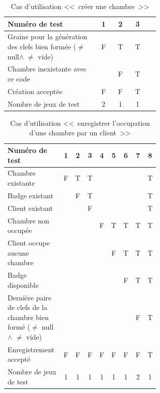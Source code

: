 \documentclass[11pt,article]{article}
\newcommand{\nullvalue}{\textsf{null}\xspace}
\begin{document}
\begin{table}[htbp!]
\begin{tabular}{|p{0.6\linewidth}|c|c|c|c|}
\hline
Numéro de test
&1&2&3\\
\hline

\hline
Graine pour la génération des clefs bien formée ($\neq$ \nullvalue $\land$ $\neq$ vide)
&F&T&T\\
\hline
Chambre inexistante avec ce code
& &F&T\\
\hline
\hline
Création acceptée
&F&F&T\\
\hline
\hline
Nombre de jeux de test
&2&1&1\\
\hline
\end{tabular}
\caption{Cas d'utilisation <<~créer une chambre~>>}
\end{table}
        \begin{table}[htbp!]
            \begin{tabular}{|p{0.6\linewidth}|c|c|c|c|c|c|c|c|}
                \hline
                Numéro de test
                    &1&2&3&4&5&6&7&8\\

                \hline
                Chambre existante
                    &F&T&T& & & & &T\\
                \hline
                Badge existant
                    & &F&T& & & & &T\\
				\hline
                Client existant
                    & & &F& & & & &T\\
                \hline
                \hline
                Chambre non occupée
                    & & & &F&T&T&T&T\\
                \hline
				\hline
				Client occupe aucune chambre
					& & & & &F&T&T&T\\
				\hline
				\hline
				Badge disponible
					& & & & & &F&T&T\\
				\hline
				\hline
                Dernière paire de clefs de la chambre bien formé ($\neq$ \nullvalue $\land$ $\neq$ vide)
                    & & & & & & &F&T\\
                \hline
                \hline
                Enregistrement accepté
                    &F&F&F&F&F&F&F&T\\
                \hline
                \hline
                Nombre de jeux de test
                                    &1&1&1&1&1&1&2&1\\
                \hline
            \end{tabular}
            \caption{Cas d'utilisation <<~enregistrer l'occupation d'une chambre par un client~>>}
        \end{table}
\end{document}

